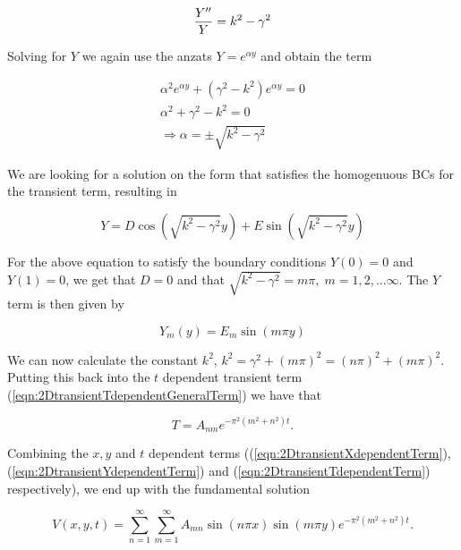 \documentclass{article}
\begin{document}
\begin{subequations}
	\begin{equation}
	\frac{Y''}{Y} = k^2 - \gamma^2\\
	\end{equation}
\end{subequations}

Solving for $Y$ we again use the anzats $Y=e^{\alpha y}$ and obtain the term

\begin{subequations}
	\begin{eqnarray}
	\alpha^2 e^{\alpha y} + (\gamma^2 - k^2)e^{\alpha y} = 0 \\
	\alpha^2 + \gamma^2 - k^2 = 0 \\
	\Rightarrow \alpha = \pm \sqrt{k^2 - \gamma^2} 
	\end{eqnarray}
\end{subequations}

We are looking for a solution on the form that satisfies the homogenuous BCs for the transient term, resulting in

\begin{equation}
Y = D\cos(\sqrt{k^2 - \gamma^2}y) + E\sin(\sqrt{k^2 - \gamma^2}y)
\end{equation}

For the above equation to satisfy the boundary conditions $Y(0) = 0$ and $Y(1) = 0$, we get that $D = 0$ and that $\sqrt{k^2 - \gamma^2} = m\pi,\; m = 1,2,...\infty$. The $Y$ term is then given by

\begin{equation}
Y_m(y) = E_m\sin(m\pi y)
\label{eqn:2DtransientYdependentTerm}
\end{equation}

We can now calculate the constant $k^2$,  $k^2 = \gamma^2 + (m\pi)^2 = (n\pi)^2 + (m\pi)^2$. Putting this back into the $t$ dependent transient term (\ref{eqn:2DtransientTdependentGeneralTerm}) we have that 

\begin{equation}
T = A_{nm}e^{-\pi^2(m^2+n^2)t}.
\label{eqn:2DtransientTdependentTerm}
\end{equation}

Combining the $x,y$ and $t$ dependent terms ((\ref{eqn:2DtransientXdependentTerm}), (\ref{eqn:2DtransientYdependentTerm}) and (\ref{eqn:2DtransientTdependentTerm}) respectively), we end up with the fundamental solution

\begin{equation}
V(x,y,t) = \sum_{n=1}^{\infty} \sum_{m=1}^{\infty} A_{mn}\sin(n\pi x)\sin(m\pi y)e^{-\pi^2(m^2+n^2)t}.
\end{equation}
\end{document}
